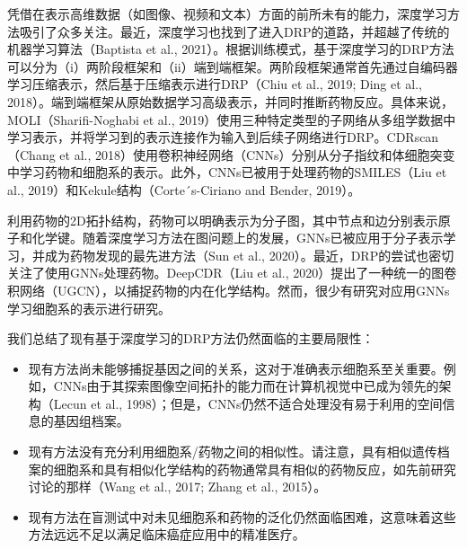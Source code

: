 凭借在表示高维数据（如图像、视频和文本）方面的前所未有的能力，深度学习方法吸引了众多关注。最近，深度学习也找到了进入DRP的道路，并超越了传统的机器学习算法（Baptista et al., 2021）。根据训练模式，基于深度学习的DRP方法可以分为（i）两阶段框架和（ii）端到端框架。两阶段框架通常首先通过自编码器学习压缩表示，然后基于压缩表示进行DRP（Chiu et al., 2019; Ding et al., 2018）。端到端框架从原始数据学习高级表示，并同时推断药物反应。具体来说，MOLI（Sharifi-Noghabi et al., 2019）使用三种特定类型的子网络从多组学数据中学习表示，并将学习到的表示连接作为输入到后续子网络进行DRP。CDRscan（Chang et al., 2018）使用卷积神经网络（CNNs）分别从分子指纹和体细胞突变中学习药物和细胞系的表示。此外，CNNs已被用于处理药物的SMILES（Liu et al., 2019）和Kekule结构（Corte´s-Ciriano and Bender, 2019）。

利用药物的2D拓扑结构，药物可以明确表示为分子图，其中节点和边分别表示原子和化学键。随着深度学习方法在图问题上的发展，GNNs已被应用于分子表示学习，并成为药物发现的最先进方法（Sun et al., 2020）。最近，DRP的尝试也密切关注了使用GNNs处理药物。DeepCDR（Liu et al., 2020）提出了一种统一的图卷积网络（UGCN），以捕捉药物的内在化学结构。然而，很少有研究对应用GNNs学习细胞系的表示进行研究。

我们总结了现有基于深度学习的DRP方法仍然面临的主要局限性：
\begin{itemize}
    \item 现有方法尚未能够捕捉基因之间的关系，这对于准确表示细胞系至关重要。例如，CNNs由于其探索图像空间拓扑的能力而在计算机视觉中已成为领先的架构（Lecun et al., 1998）；但是，CNNs仍然不适合处理没有易于利用的空间信息的基因组档案。
    \item 现有方法没有充分利用细胞系/药物之间的相似性。请注意，具有相似遗传档案的细胞系和具有相似化学结构的药物通常具有相似的药物反应，如先前研究讨论的那样（Wang et al., 2017; Zhang et al., 2015）。
    \item 现有方法在盲测试中对未见细胞系和药物的泛化仍然面临困难，这意味着这些方法远远不足以满足临床癌症应用中的精准医疗。
\end{itemize}

